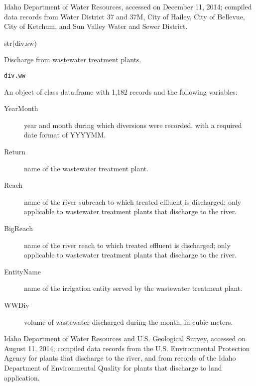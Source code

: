 \documentclass[a4paper]{book}
\begin{document}
%
\begin{Source}\relax
Idaho Department of Water Resources, accessed on December 11, 2014;
compiled data records from Water District 37 and 37M, City of Hailey,
City of Bellevue, City of Ketchum, and Sun Valley Water and Sewer District.
\end{Source}
%
\begin{Examples}
\begin{ExampleCode}
str(div.sw)

\end{ExampleCode}
\end{Examples}
%
\begin{Description}\relax
Discharge from wastewater treatment plants.
\end{Description}
%
\begin{Usage}
\begin{verbatim}
div.ww
\end{verbatim}
\end{Usage}
%
\begin{Format}
An object of class data.frame with 1,182 records and the following variables:
\begin{description}

\item[YearMonth] year and month during which diversions were recorded,
with a required date format of YYYYMM.
\item[Return] name of the wastewater treatment plant.
\item[Reach] name of the river subreach to which treated effluent is discharged;
only applicable to wastewater treatment plants that discharge to the river.
\item[BigReach] name of the river reach to which treated effluent is discharged;
only applicable to wastewater treatment plants that discharge to the river.
\item[EntityName] name of the irrigation entity served by the wastewater treatment plant.
\item[WWDiv] volume of wastewater discharged during the month, in cubic meters.

\end{description}
\end{Format}
%
\begin{Source}\relax
Idaho Department of Water Resources and U.S. Geological Survey,
accessed on August 11, 2014; compiled data records from the
U.S. Environmental Protection Agency for plants that discharge to the river,
and from records of the Idaho Department of Environmental Quality for
plants that discharge to land application.
\end{Source}
\end{document}
